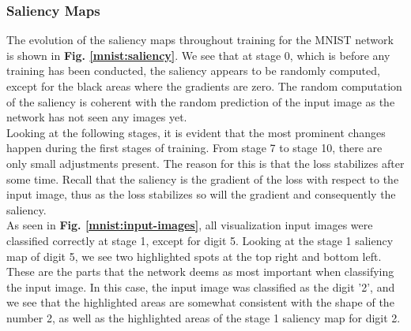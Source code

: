 


\subsubsection{Saliency Maps}

The evolution of the saliency maps throughout training for the MNIST network is shown in \textbf{Fig. \ref{mnist:saliency}}. We see that at stage 0, which is before any training has been conducted, the saliency appears to be randomly computed, except for the black areas where the gradients are zero. The random computation of the saliency is coherent with the random prediction of the input image as the network has not seen any images yet.\\

\noindent Looking at the following stages, it is evident that the most prominent changes happen during the first stages of training. From stage 7 to stage 10, there are only small adjustments present. The reason for this is that the loss stabilizes after some time. Recall that the saliency is the gradient of the loss with respect to the input image, thus as the loss stabilizes so will the gradient and consequently the saliency. \\

\noindent As seen in \textbf{Fig. \ref{mnist:input-images}}, all visualization input images were classified correctly at stage 1, except for digit 5. Looking at the stage 1 saliency map of digit 5, we see two highlighted spots at the top right and bottom left. These are the parts that the network deems as most important when classifying the input image. In this case, the input image was classified as the digit '2', and we see that the highlighted areas are somewhat consistent with the shape of the number 2, as well as the highlighted areas of the stage 1 saliency map for digit 2. \\


